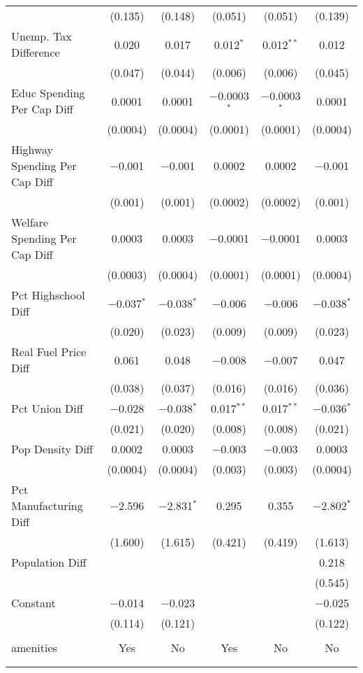 \begin{table}[!htbp]
\begin{tabular}{@{\extracolsep{5pt}}lccccc}
  & (0.135) & (0.148) & (0.051) & (0.051) & (0.139) \\ 
  Unemp. Tax Difference & 0.020 & 0.017 & 0.012$^{*}$ & 0.012$^{**}$ & 0.012 \\ 
  & (0.047) & (0.044) & (0.006) & (0.006) & (0.045) \\ 
  Educ Spending Per Cap Diff & 0.0001 & 0.0001 & $-$0.0003$^{*}$ & $-$0.0003$^{*}$ & 0.0001 \\ 
  & (0.0004) & (0.0004) & (0.0001) & (0.0001) & (0.0004) \\ 
  Highway Spending Per Cap Diff & $-$0.001 & $-$0.001 & 0.0002 & 0.0002 & $-$0.001 \\ 
  & (0.001) & (0.001) & (0.0002) & (0.0002) & (0.001) \\ 
  Welfare Spending Per Cap Diff & 0.0003 & 0.0003 & $-$0.0001 & $-$0.0001 & 0.0003 \\ 
  & (0.0003) & (0.0004) & (0.0001) & (0.0001) & (0.0004) \\ 
  Pct Highschool Diff & $-$0.037$^{*}$ & $-$0.038$^{*}$ & $-$0.006 & $-$0.006 & $-$0.038$^{*}$ \\ 
  & (0.020) & (0.023) & (0.009) & (0.009) & (0.023) \\ 
  Real Fuel Price Diff & 0.061 & 0.048 & $-$0.008 & $-$0.007 & 0.047 \\ 
  & (0.038) & (0.037) & (0.016) & (0.016) & (0.036) \\ 
  Pct Union Diff & $-$0.028 & $-$0.038$^{*}$ & 0.017$^{**}$ & 0.017$^{**}$ & $-$0.036$^{*}$ \\ 
  & (0.021) & (0.020) & (0.008) & (0.008) & (0.021) \\ 
  Pop Density Diff & 0.0002 & 0.0003 & $-$0.003 & $-$0.003 & 0.0003 \\ 
  & (0.0004) & (0.0004) & (0.003) & (0.003) & (0.0004) \\ 
  Pct Manufacturing Diff & $-$2.596 & $-$2.831$^{*}$ & 0.295 & 0.355 & $-$2.802$^{*}$ \\ 
  & (1.600) & (1.615) & (0.421) & (0.419) & (1.613) \\ 
  Population Diff &  &  &  &  & 0.218 \\ 
  &  &  &  &  & (0.545) \\ 
  Constant & $-$0.014 & $-$0.023 &  &  & $-$0.025 \\ 
  & (0.114) & (0.121) &  &  & (0.122) \\ 
 \hline \\[-1.8ex] 
amenities & Yes & No & Yes & No & No \\ 
\hline \\[-1.8ex] 
\hline 
\hline \\[-1.8ex] 
\end{tabular} 
\end{table} 
